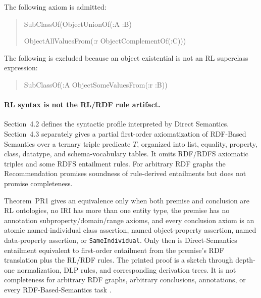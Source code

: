 The following axiom is admitted:
\begin{quote}\small\ttfamily
SubClassOf(ObjectUnionOf(:A :B)\par
\hspace*{2em}ObjectAllValuesFrom(:r ObjectComplementOf(:C)))
\end{quote}
The following is excluded because an object existential is not an RL
superclass expression:
\begin{quote}\small\ttfamily
SubClassOf(:A ObjectSomeValuesFrom(:r :B))
\end{quote}

\paragraph{RL syntax is not the RL/RDF rule artifact.}
Section~4.2 defines the syntactic profile interpreted by Direct Semantics.
Section~4.3 separately gives a partial first-order axiomatization of
RDF-Based Semantics over a ternary triple predicate \(T\), organized into list,
equality, property, class, datatype, and schema-vocabulary tables.  It omits
RDF/RDFS axiomatic triples and some RDFS entailment rules.  For arbitrary RDF
graphs the Recommendation promises soundness of rule-derived entailments but
does not promise completeness.

Theorem~PR1 gives an equivalence only when both premise and conclusion are RL
ontologies, no IRI has more than one entity type, the premise has no annotation
subproperty/domain/range axioms, and every conclusion axiom is an atomic
named-individual class assertion, named object-property assertion, named
data-property assertion, or \texttt{SameIndividual}.  Only then is
Direct-Semantics entailment equivalent to first-order entailment from the
premise's RDF translation plus the RL/RDF rules.  The printed proof is a sketch
through depth-one normalization, DLP rules, and corresponding derivation trees.
It is not completeness for arbitrary RDF graphs, arbitrary conclusions,
annotations, or every RDF-Based-Semantics task
\cite[thm.~PR1]{W3COWL2Profiles2012}.

